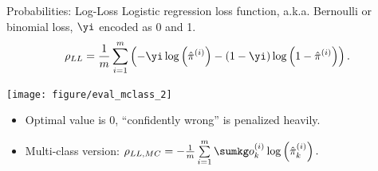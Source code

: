 \documentclass[11pt,compress,t,notes=noshow, xcolor=table]{beamer}
\newenvironment{knitrout}{}{} %
\begin{document}
\begin{vbframe}{Probabilities: Log-Loss}
Logistic regression loss function, a.k.a. Bernoulli or binomial loss, $\yi$ 
encoded as 0 and 1.
$$\rho_{LL} = \frac{1}{m} \sum_{i = 1}^m \left( - \yi \log \left( 
\hat \pi^{(i)} \right) - \left( 1-\yi \right) \log \left( 1 - \hat \pi^{(i)} 
\right) \right).$$
\begin{knitrout}\scriptsize
{}\color{fgcolor}

{\centering \texttt{[image: figure/eval\_mclass\_2]}  

}

\end{knitrout}
\begin{itemize}
  \item Optimal value is 0, \enquote{confidently wrong} is penalized heavily.
  \item Multi-class version: $\rho_{LL, MC} = 
  - \frac{1}{m} \sum\limits_{i = 1}^m \sumkg o_k^{(i)} \log \left( 
  \hat \pi_k^{(i)} \right).$
\end{itemize}
\end{vbframe}


\endlecture
\end{document}
